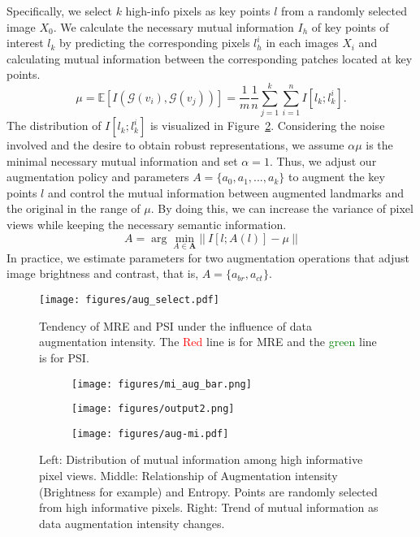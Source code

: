 \documentclass[10pt,twocolumn,letterpaper]{article}
\begin{document}
Specifically, we select $k$ high-info pixels as key points $l$ from a randomly selected image $X_0$. We calculate the necessary mutual information $I_h$ of key points of interest $l_k$ by predicting the corresponding pixels $l^i_h$ in each images $X_i$ and calculating mutual information between the corresponding patches located at key points. 
\begin{equation}
    \mu = \mathbb{E} [I(\mathcal{G}(v_i), \mathcal{G}(v_j))] = \frac{1}{m} \frac{1}{n} \sum_{j=1}^k \sum_{i=1}^n I[l_k; l^i_k].
    \label{eq:estimate1}
\end{equation}
The distribution of $I[l_k; l^i_k]$ is visualized in Figure~\ref{fig:mi_aug_bar}. Considering the noise involved and the desire to obtain robust representations, we assume $\alpha\mu$ is the minimal necessary mutual information and set $\alpha=1$. Thus, we adjust our augmentation policy and parameters $A=\{a_0, a_1, ..., a_k\}$ to augment the key points $l$ and control the mutual information between augmented landmarks and the original in the range of $\mu$. By doing this, we can increase the variance of pixel views while keeping the necessary semantic information.
\begin{equation}
    A = \arg \min_{A \in \mathbf{A} } ||~I[l;A(l)] - \mu~|| 
    \label{eq:estimate2}
\end{equation}
In practice, we estimate parameters for two augmentation operations that adjust image brightness and contrast, that is, $A = \{a_{br}, a_{ct}\}$. 

\begin{figure}
    \centering
    \texttt{[image: figures/aug\_select.pdf]}
    \caption{Tendency of MRE and PSI under the influence of data augmentation intensity. The \textcolor{red}{Red} line is for MRE and the \textcolor{green}{green} line is for PSI. }
    \label{fig:aug_select}
\end{figure}

\begin{figure*}
    \centering
    \begin{subfigure}{.33\textwidth}
      \centering
      \texttt{[image: figures/mi\_aug\_bar.png]}  
       \caption{}
    \label{fig:mi_aug_bar}
    \end{subfigure}
    \begin{subfigure}{.33\textwidth}
      \centering
      \texttt{[image: figures/output2.png]}  
       \caption{}
       \label{fig:aug_int2}
    \end{subfigure}
    \begin{subfigure}{.33\textwidth}
      \centering
      \texttt{[image: figures/aug-mi.pdf]}  
      \caption{}
      \label{fig:aug_int3}
    \end{subfigure}
    \caption{Left: Distribution of mutual information among high informative pixel views. Middle: Relationship of Augmentation intensity (Brightness for example) and Entropy. Points are randomly selected from high informative pixels. Right: Trend of mutual information as data augmentation intensity changes.  }
    \label{fig:aug_int}
\end{figure*}
\end{document}
